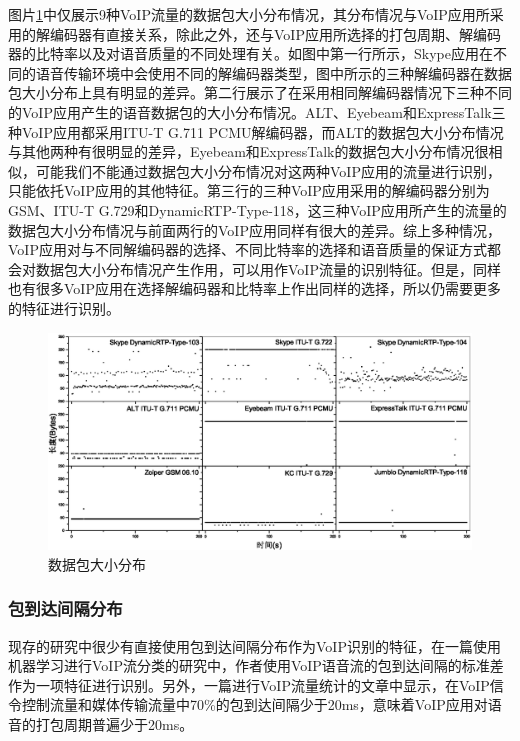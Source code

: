 

图片\ref{fig:psd}中仅展示9种VoIP流量的数据包大小分布情况，其分布情况与VoIP应用所采用的解编码器有直接关系，除此之外，还与VoIP应用所选择的打包周期、解编码器的比特率以及对语音质量的不同处理有关。如图中第一行所示，Skype应用在不同的语音传输环境中会使用不同的解编码器类型，图中所示的三种解编码器在数据包大小分布上具有明显的差异。第二行展示了在采用相同解编码器情况下三种不同的VoIP应用产生的语音数据包的大小分布情况。ALT、Eyebeam和ExpressTalk三种VoIP应用都采用ITU-T G.711 PCMU解编码器，而ALT的数据包大小分布情况与其他两种有很明显的差异，Eyebeam和ExpressTalk的数据包大小分布情况很相似，可能我们不能通过数据包大小分布情况对这两种VoIP应用的流量进行识别，只能依托VoIP应用的其他特征。第三行的三种VoIP应用采用的解编码器分别为GSM、ITU-T G.729和DynamicRTP-Type-118，这三种VoIP应用所产生的流量的数据包大小分布情况与前面两行的VoIP应用同样有很大的差异。综上多种情况，VoIP应用对与不同解编码器的选择、不同比特率的选择和语音质量的保证方式都会对数据包大小分布情况产生作用，可以用作VoIP流量的识别特征。但是，同样也有很多VoIP应用在选择解编码器和比特率上作出同样的选择，所以仍需要更多的特征进行识别。

\begin{figure}[thb]
\begin{center}
\includegraphics[width=1\textwidth]{figures/psd.eps}
\caption{数据包大小分布}\label{fig:psd}
\end{center}
\end{figure}


\subsubsection{包到达间隔分布}
现存的研究中很少有直接使用包到达间隔分布作为VoIP识别的特征，在一篇使用机器学习进行VoIP流分类的研究中\supercite{5}，作者使用VoIP语音流的包到达间隔的标准差作为一项特征进行识别。另外，一篇进行VoIP流量统计的文章中显示，在VoIP信令控制流量和媒体传输流量中70\%的包到达间隔少于20ms\supercite{he2007analysing}，意味着VoIP应用对语音的打包周期普遍少于20ms。

